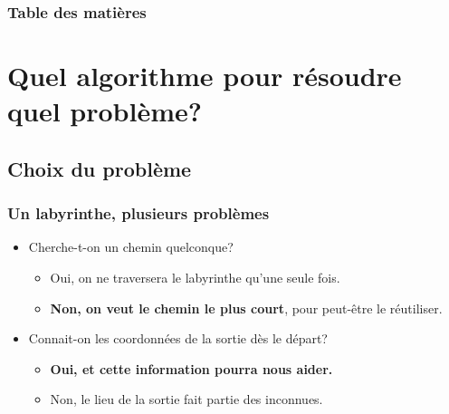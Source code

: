 \documentclass[]{beamer}
\begin{document}
\begin{frame}
  \frametitle{Table des matières}
  \tableofcontents
\end{frame} %

\section{Quel algorithme pour résoudre quel problème?}
\subsection{Choix du problème}
\begin{frame} 
  \frametitle{Un labyrinthe, plusieurs problèmes}
  \begin{itemize}
  \item<1-> Cherche-t-on un chemin quelconque?
    \begin{itemize}
    \item<2-> Oui, on ne traversera le labyrinthe qu'une seule fois.
    \item<2-> \textbf<3->{Non, on veut le chemin le plus court}, pour peut-être le réutiliser.
    \end{itemize}
  \item<4-> Connait-on les coordonnées de la sortie dès le départ?
    \begin{itemize}
    \item<5-> \textbf<6->{Oui, et cette information pourra nous aider.}
    \item<5-> Non, le lieu de la sortie fait partie des inconnues.
    \end{itemize}
  \end{itemize}
\end{frame} %
\end{document}
